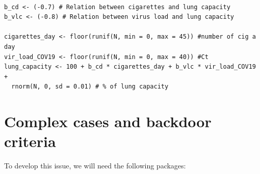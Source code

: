\documentclass{article}
\begin{document}
\begin{lstlisting}

b_cd <- (-0.7) # Relation between cigarettes and lung capacity
b_vlc <- (-0.8) # Relation between virus load and lung capacity 

cigarettes_day <- floor(runif(N, min = 0, max = 45)) #number of cig a day
vir_load_COV19 <- floor(runif(N, min = 0, max = 40)) #Ct
lung_capacity <- 100 + b_cd * cigarettes_day + b_vlc * vir_load_COV19 + 
  rnorm(N, 0, sd = 0.01) # % of lung capacity

\end{lstlisting}












\section{Complex cases and backdoor criteria}

To develop this issue, we will need the following packages:
\end{document}
